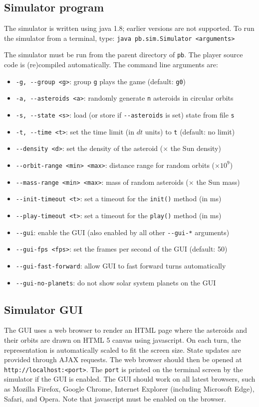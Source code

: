 \begin{appendices}
\subsection{Simulator program}

The simulator is written using java 1.8; earlier versions are not supported. To run the simulator from a terminal, type: \verb#java pb.sim.Simulator <arguments>#

\noindent
The simulator must be run from the parent directory of \verb#pb#.
The player source code is (re)compiled automatically. The command line arguments are:
\begin{itemize}
\item \verb#-g, --group <g>#: group \verb#g# plays the game (default: \verb#g0#)
\item \verb#-a, --asteroids <a>#: randomly generate \verb#n# asteroids in circular orbits
\item \verb#-s, --state <s>#: load (or store if \verb#--asteroids# is set) state from file \verb#s# 
\item \verb#-t, --time <t>#: set the time limit (in $dt$ units) to \verb#t# (default: no limit)
\item \verb#--density <d>#: set the density of the asteroid ($\times$ the Sun density)
\item \verb#--orbit-range <min> <max>#: distance range for random orbits ($\times 10^9$)
\item \verb#--mass-range <min> <max>#: mass of random asteroids ($\times$ the Sun mass)
\item \verb#--init-timeout <t>#: set a timeout for the \verb#init()# method (in ms)
\item \verb#--play-timeout <t>#: set a timeout for the \verb#play()# method (in ms)
\item \verb#--gui#: enable the GUI (also enabled by all other \verb#--gui-*# arguments)
\item \verb#--gui-fps <fps>#: set the frames per second of the GUI (default: 50)
\item \verb#--gui-fast-forward#: allow GUI to fast forward turns automatically
\item \verb#--gui-no-planets#: do not show solar system planets on the GUI
\end{itemize}

\subsection{Simulator GUI}

The GUI uses a web browser to render an HTML page where the asteroids and their orbits are drawn on HTML 5 canvas using javascript. On each turn, the representation is automatically scaled to fit the screen size. State updates are provided through AJAX requests. The web browser should then be opened at \verb#http://localhost:<port>#. The \verb#port# is printed on the terminal screen by the simulator if the GUI is enabled. The GUI should work on all latest browsers, such as Mozilla Firefox, Google Chrome, Internet Explorer (including Microsoft Edge), Safari, and Opera. Note that javascript must be enabled on the browser.
\end{appendices}
